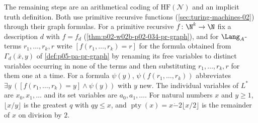 The remaining steps are an arithmetical coding of
\(\mathrm{HF}(\mathcal N)\) and an implicit truth definition.  Both use
primitive recursive functions (\cref{sec:turing-machines-02}) through their
graph formulas.  For a primitive recursive \(f\colon\N^{k}\to\N\) fix a
description \(d\) with \(f=f_d\) (\cref{thm:p02-w02b-p02-034-pr-graph}),
and for \(\Lang_A\)-terms \(r_1,\ldots,r_k,r\) write
\([f(r_1,\ldots,r_k)=r]\) for the formula obtained from
\(\Gamma_d(\bar x,y)\) of \cref{def:p05-pa-pr-graph} by renaming its free
variables to distinct variables occurring in none of the terms and then
substituting \(r_1,\ldots,r_k,r\) for them one at a time.  For a formula
\(\psi(y)\), \(\psi(f(r_1,\ldots,r_k))\) abbreviates
\(\exists y\,([f(r_1,\ldots,r_k)=y]\land\psi(y))\) with \(y\) new.  The
individual variables of \(L^{*}\) are \(x_0,x_1,\ldots\) and its set
variables are \(a_0,a_1,\ldots\).  For natural numbers \(x\) and \(y\geq1\),
\(\lfloor x/y\rfloor\) is the greatest \(q\) with \(qy\leq x\), and
\(\operatorname{pty}(x)=x\mathbin{\dot{-}}2\lfloor x/2\rfloor\) is the remainder of
\(x\) on division by \(2\).

